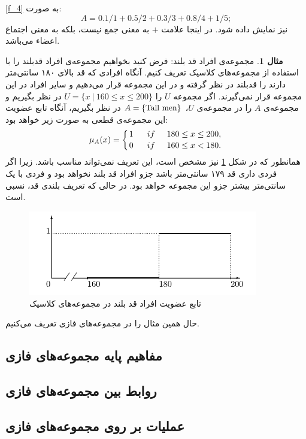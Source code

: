 \documentclass[12pt,a4paper]{article}
\theoremstyle{definition}
\newtheorem{exmp}{مثال}[section]
\begin{document}
 \ref{f_4}
 به صورت:
 \begin{equation}
A= 0.1/1 + 0.5/2 + 0.3/3 + 0.8/4 + 1/5;
 \end{equation}
نیز نمایش داده شود. در اینجا علامت $ + $ به معنی جمع نیست، بلکه به معنی اجتماع اعضاء می‌باشد. 
\cite{Lee2005}
\\
\begin{exmp}
	مجموعه‌ی افراد قد بلند: فرض کنید بخواهیم مجموعه‌ی افراد قدبلند را با استفاده از مجموعه‌های کلاسیک تعریف کنیم. آنگاه افرادی که قد بالای ۱۸۰ سانتی‌متر دارند را قدبلند در نظر گرفته و در این مجموعه قرار می‌دهیم و سایر افراد در این مجموعه قرار نمی‌گیرند. اگر مجموعه $U$ را   
	$U = \{ x\ |\ 160 \le x \le 200 \}$
	در نظر بگیریم و مجموعه‌ی $A$ را در مجموعه‌ی $U$، 
	$A = \{ {\rm Tall\ men} \}$
	در نظر بگیریم، آنگاه تابع عضویت این مجموعه‌ی قطعی به صورت زیر خواهد بود:
\begin{equation}
\mu_{A}(x)=\left \{ 
{1 \atop 0}
\hskip 0.5cm
{if \hskip 0.5cm 180 \le x \le 200, \atop
	if \hskip 0.5cm  160 \le x < 180.} \right.
\end{equation}
همانطور که در شکل 
\ref{fig:f_1}
نیز مشخص است، این تعریف نمی‌تواند مناسب باشد. زیرا اگر فردی داری قد ۱۷۹ سانتی‌متر باشد جزو افراد قد بلند نخواهد بود و فردی با یک سانتی‌متر بیشتر جزو این مجموعه خواهد بود. در حالی که تعریف بلندی قد، نسبی است. \\
\begin{figure}[h]
	\centering 
	\includegraphics[width=100mm]{Images/Fig1.png}
	\caption{تابع عضویت افراد قد بلند در مجموعه‌های کلاسیک}\label{fig:f_1}
\end{figure}
حال همین مثال را در مجموعه‌های فازی تعریف می‌کنیم. 
\end{exmp}
 \subsection{ مفاهیم پایه مجموعه‌های فازی}
 \subsection{ روابط بین مجموعه‌های فازی}
 \subsection{عملیات بر روی مجموعه‌های فازی}
\end{document}
